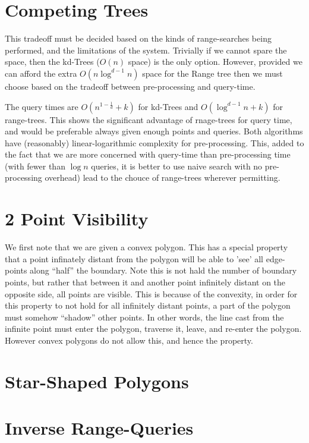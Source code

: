 \section {Competing Trees}
This tradeoff must be decided based on the kinds of range-searches being performed, and the limitations of the system.
Trivially if we cannot spare the space, then the kd-Trees ($O(n)$ space) is the only option.
However, provided we can afford the extra $O(n\log^{d-1}n)$ space for the Range tree then we must choose based on the tradeoff between pre-processing and query-time.

The query times are $O(n^{1-\frac{1}{d}} + k)$ for kd-Trees and $O(\log^{d-1}n+k)$ for range-trees.
This shows the significant advantage of rnage-trees for query time, and would be preferable always given enough points and queries.
Both algorithms have (reasonably) linear-logarithmic complexity for pre-processing.
This, added to the fact that we are more concerned with query-time than pre-processing time (with fewer than $\log n$ queries, it is better to use naive search with no pre-processing overhead) lead to the chouce of range-trees wherever permitting.

\section {2 Point Visibility}
We first note that we are given a convex polygon.
This has a special property that a point infinately distant from the polygon will be able to 'see' all edge-points along ``half'' the boundary.
Note this is not hald the number of boundary points, but rather that between it and another point infinitely distant on the opposite side, all points are visible.
This is because of the convexity, in order for this property to not hold for all infinitely distant points, a part of the polygon must somehow ``shadow'' other points.
In other words, the line cast from the infinite point must enter the polygon, traverse it, leave, and re-enter the polygon.
However convex polygons do not allow this, and hence the property.

 

\section {Star-Shaped Polygons}

\section {Inverse Range-Queries}


